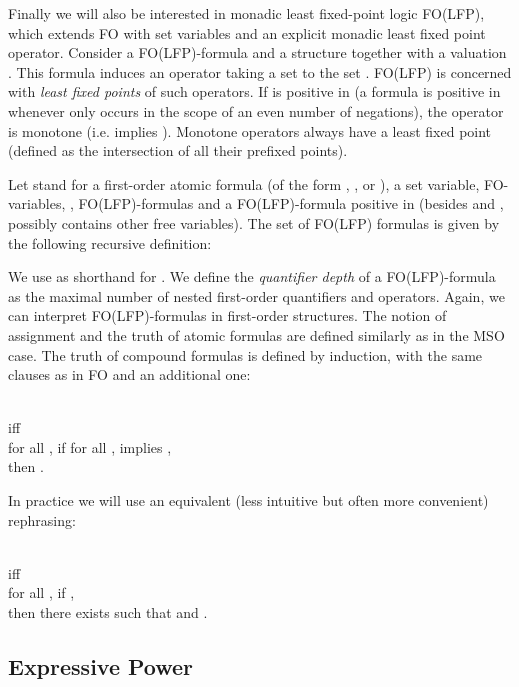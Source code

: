 \documentclass{LMCS}
\newcommand{\fo}{\textsf{FO}\xspace}
\newcommand{\mso}{\textsf{MSO}\xspace}
\newcommand{\folfp}{\textsf{FO(LFP)}\xspace}
\begin{document}
Finally we will also be interested in monadic least fixed-point logic
\folfp, which extends \fo with set variables and an explicit
monadic least fixed point operator. Consider a \folfp-formula
 and a structure  together with a valuation .
This formula induces an operator  taking a set  to the set . \folfp is concerned with \emph{least fixed points} of such
operators. If  is positive in  (a formula is positive in
 whenever  only occurs in the scope of an even number of
negations), the operator  is monotone (i.e.  implies ). Monotone operators
always have a least fixed point 
(defined as the intersection of all
their prefixed points).

\begin{defi}
[Syntax and semantics of \folfp]
    Let  stand for a first-order atomic formula  (of the form
    , , or ),  a set variable,  \fo-variables, ,  \folfp-formulas and 
    a \folfp-formula positive in  (besides  and ,  possibly contains other free variables).
    The set of \folfp formulas is given by the following recursive definition:

We use  as shorthand for . We define the \textit{quantifier depth} of a \folfp-formula as the
maximal number of nested first-order quantifiers and  operators.
Again, we can interpret \folfp-formulas in first-order structures. The
notion of assignment and the truth of atomic formulas are defined similarly
as in the \mso case. The truth of compound formulas is defined by induction,
with the same clauses as in \fo and an additional one:
\begin{center}
\\
iff\\
for all , if for all ,  implies ,\\
then .
\end{center}
\end{defi}

\begin{rem}
In practice we will use an equivalent (less intuitive but often
more convenient) rephrasing:
\begin{center}
\\
iff\\
for all , if ,\\
then there exists  such that  and .
\end{center}
\end{rem}

\subsection{Expressive Power}
\label{exppow}
\end{document}
